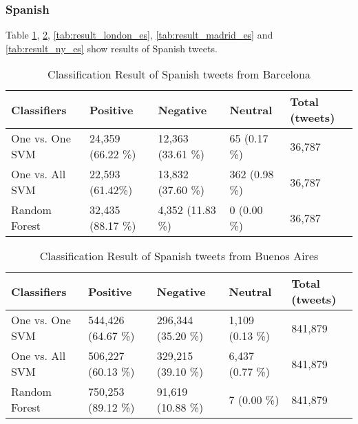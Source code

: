 \subsubsection{Spanish}
Table \ref{tab:result_barcelona_es}, \ref{tab:result_buenosaires_es}, \ref{tab:result_london_es}, \ref{tab:result_madrid_es} and \ref{tab:result_ny_es} show results of Spanish tweets.
\begin{table}[ht]
	\caption{Classification Result of Spanish tweets from Barcelona}
	\begin{tabular}{|l|p{1.8cm}|p{1.8cm}|p{1.8cm}|p{1.8cm}|} \hline
	Classifiers & Positive & Negative & Neutral & Total (tweets)\\ \hline
One vs. One SVM & 24,359 (66.22 \%)& 12,363 (33.61 \%)& 65 \newline(0.17 \%) & 36,787\\ \hline
One vs. All SVM & 22,593 (61.42\%) & 13,832 (37.60 \%)& 362 \newline(0.98 \%)& 36,787\\ \hline
Random Forest   & 32,435 (88.17 \%) & 4,352 (11.83 \%) & 0  \newline(0.00 \%)& 36,787 \\ \hline
	\end{tabular}
	\label{tab:result_barcelona_es}
\end{table}


\begin{table}[ht]
	\caption{Classification Result of Spanish tweets from Buenos Aires}
	\begin{tabular}{|l|p{1.8cm}|p{1.8cm}|p{1.8cm}|p{1.8cm}|} \hline
	Classifiers & Positive & Negative & Neutral & Total (tweets)\\ \hline
One vs. One SVM & 544,426 (64.67 \%)& 296,344 (35.20 \%)& 1,109 \newline(0.13 \%)& 841,879 \\ \hline
One vs. All SVM & 506,227 (60.13 \%)& 329,215 (39.10 \%)& 6,437 \newline(0.77 \%)& 841,879 \\ \hline
Random Forest   & 750,253 (89.12 \%)& 91,619 (10.88 \%) & 7 \newline(0.00 \%) & 841,879 \\ \hline
	\end{tabular}
	\label{tab:result_buenosaires_es}
\end{table}

